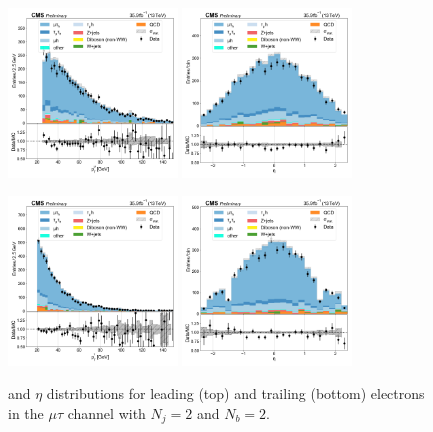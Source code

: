 \begin{figure}[htb!]
    \centering
    \includegraphics[width=0.4\textwidth]{chapters/Appendix/sectionPlots/figures/data_mc_overlays/mutau_2016_cat_eq2_eq2_signal_linear_lepton_lepton1_pt}
    \includegraphics[width=0.4\textwidth]{chapters/Appendix/sectionPlots/figures/data_mc_overlays/mutau_2016_cat_eq2_eq2_signal_linear_lepton_lepton1_eta}

    \includegraphics[width=0.4\textwidth]{chapters/Appendix/sectionPlots/figures/data_mc_overlays/mutau_2016_cat_eq2_eq2_signal_linear_lepton_lepton2_pt}
    \includegraphics[width=0.4\textwidth]{chapters/Appendix/sectionPlots/figures/data_mc_overlays/mutau_2016_cat_eq2_eq2_signal_linear_lepton_lepton2_eta}
    \caption{\pt and $\eta$ distributions for leading (top) and trailing
        (bottom) electrons in the $\mu\tau$ channel with $N_{j} = 2$ and
        $N_{b} = 2$.}
    \label{fig:mutau_6_kinematic}
\end{figure}

